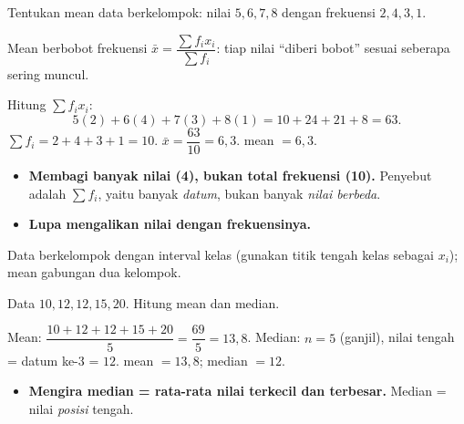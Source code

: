 \begin{soalbox}{}
Tentukan mean data berkelompok: nilai $5,6,7,8$ dengan frekuensi $2,4,3,1$.
\end{soalbox}

\begin{ingat}{Mean berbobot frekuensi}
$\bar x=\dfrac{\sum f_i x_i}{\sum f_i}$: tiap nilai ``diberi bobot'' sesuai
seberapa sering muncul.
\end{ingat}

\jawab
{} Hitung $\sum f_i x_i$:
\[
5(2)+6(4)+7(3)+8(1)=10+24+21+8=63.
\]
 $\sum f_i=2+4+3+1=10$.
 $\bar x=\dfrac{63}{10}=6{,}3$.
\jadi mean $=6{,}3$.

\begin{jebakan}
\begin{itemize}[leftmargin=*,topsep=2pt]
  \item \textbf{Membagi banyak nilai (4), bukan total frekuensi (10).} Penyebut
  adalah $\sum f_i$, yaitu banyak \emph{datum}, bukan banyak \emph{nilai berbeda}.
  \item \textbf{Lupa mengalikan nilai dengan frekuensinya.}
\end{itemize}
\end{jebakan}

\begin{variasi}
Data berkelompok dengan interval kelas (gunakan titik tengah kelas sebagai
$x_i$); mean gabungan dua kelompok.
\end{variasi}

\begin{soalbox}{}
Data $10,12,12,15,20$. Hitung mean dan median.
\end{soalbox}

\jawab
{} Mean: $\dfrac{10+12+12+15+20}{5}=\dfrac{69}{5}=13{,}8$.
 Median: $n=5$ (ganjil), nilai tengah = datum ke-3 = $12$.
\jadi mean $=13{,}8$; median $=12$.

\begin{jebakan}
\begin{itemize}[leftmargin=*,topsep=2pt]
  \item \textbf{Mengira median = rata-rata nilai terkecil dan terbesar.}
  Median = nilai \emph{posisi} tengah.
\end{itemize}
\end{jebakan}

